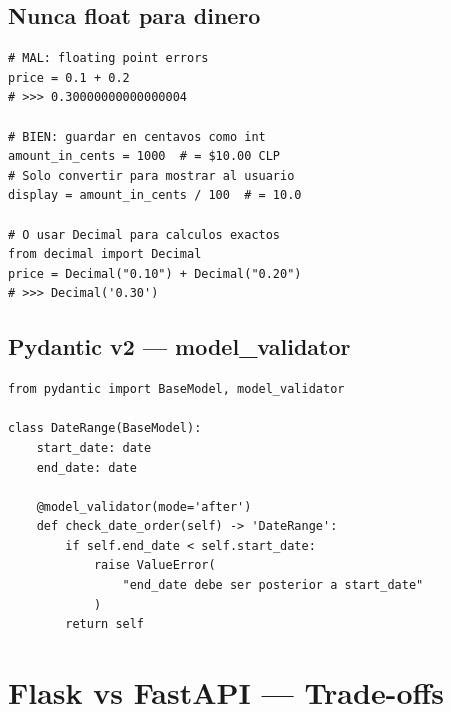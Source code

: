 \documentclass[11pt,a4paper]{article}
\begin{document}
\subsection{Nunca float para dinero}

\begin{alertbox}
\begin{lstlisting}[style=python]
# MAL: floating point errors
price = 0.1 + 0.2
# >>> 0.30000000000000004

# BIEN: guardar en centavos como int
amount_in_cents = 1000  # = $10.00 CLP
# Solo convertir para mostrar al usuario
display = amount_in_cents / 100  # = 10.0

# O usar Decimal para calculos exactos
from decimal import Decimal
price = Decimal("0.10") + Decimal("0.20")
# >>> Decimal('0.30')
\end{lstlisting}
\end{alertbox}

\subsection{Pydantic v2 — model\_validator}

\begin{pybox}
\begin{lstlisting}[style=python]
from pydantic import BaseModel, model_validator

class DateRange(BaseModel):
    start_date: date
    end_date: date

    @model_validator(mode='after')
    def check_date_order(self) -> 'DateRange':
        if self.end_date < self.start_date:
            raise ValueError(
                "end_date debe ser posterior a start_date"
            )
        return self
\end{lstlisting}
\end{pybox}

\section{Flask vs FastAPI — Trade-offs}
\end{document}
